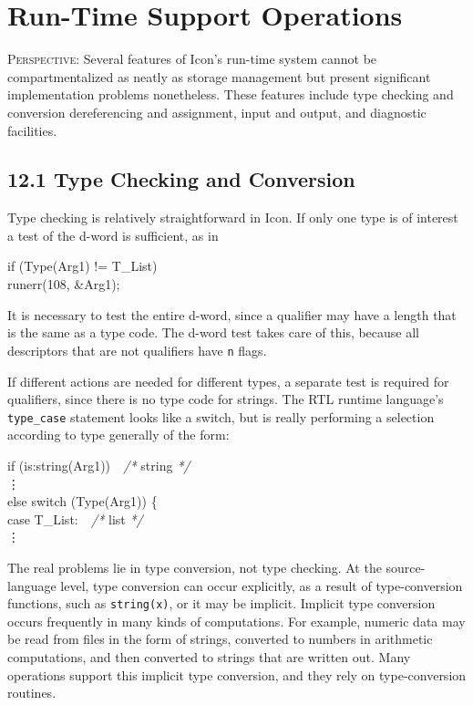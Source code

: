 \chapter{Run-Time Support Operations}

\textsc{Perspective}: Several features of Icon's run-time system
cannot be compartmentalized as neatly as storage management but
present significant implementation problems nonetheless. These
features include type checking and conversion dereferencing and
assignment, input and output, and diagnostic facilities.

\section[12.1 Type Checking and Conversion]{12.1 Type Checking and Conversion}

Type checking is relatively straightforward in Icon. If only one type
is of interest a test of the d-word is sufficient, as in

\begin{iconcode}
\>if (Type(Arg1) != T\_List)\\
\>\>runerr(108, \&Arg1);
\end{iconcode}

It is necessary to test the entire d-word, since a qualifier may have
a length that is the same as a type code. The d-word test takes care
of this, because all descriptors that are not qualifiers have \texttt{n} flags.

If different actions are needed for different types, a separate test
is required for qualifiers, since there is no type code for
strings. The RTL runtime language's \texttt{type\_case} statement
looks like a switch, but is really performing a selection according to
type generally of the form:

\begin{iconcode}
\>if (is:string(Arg1))\textit{\ \ /* }string \textit{*/}\\
\>\>\>\vdots\\
\>else switch (Type(Arg1)) \{\\
\>\> case T\_List:\textit{\ \ /* }list \textit{*/}\\
\>\>\>\vdots
\end{iconcode}

The real problems lie in type conversion, not type checking. At the
source-language level, type conversion can occur explicitly, as a
result of type-conversion functions, such as \texttt{string(x)}, or it
may be implicit. Implicit type conversion occurs frequently in many
kinds of computations. For example, numeric data may be read from
files in the form of strings, converted to numbers in arithmetic
computations, and then converted to strings that are written out.
Many operations support this implicit type conversion, and they rely
on type-conversion routines.


